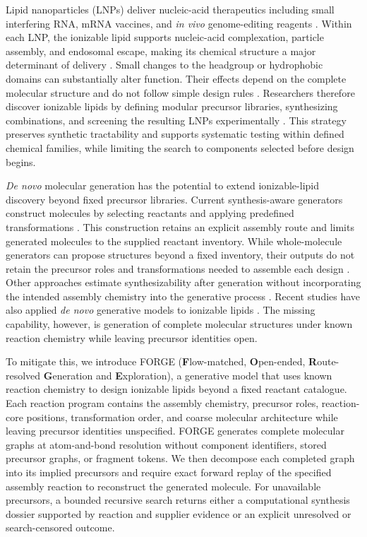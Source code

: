 \documentclass{article}
\begin{document}
Lipid nanoparticles (LNPs) deliver nucleic-acid therapeutics including small interfering RNA, mRNA vaccines, and \textit{in vivo} genome-editing reagents
\citep{adams2018patisiran,polack2020safety,baden2021efficacy,gillmore2021crispr}.
Within each LNP, the ionizable lipid supports nucleic-acid complexation, particle assembly, and endosomal escape, making its chemical structure a major determinant of delivery
\citep{cullis2017lipid,hou2021lipid}.
Small changes to the headgroup or hydrophobic domains can substantially alter function. Their effects depend on the complete molecular structure and do not follow simple design rules
\citep{cheng2020selective,han2021ionizable,hatit2023nanoparticle}.
Researchers therefore discover ionizable lipids by defining modular precursor libraries, synthesizing combinations, and screening the resulting LNPs experimentally
\citep{akinc2008combinatorial,love2010lipidlike,li2024accelerating,xu2024agile}.
This strategy preserves synthetic tractability and supports systematic testing within defined chemical families, while limiting the search to components selected before design begins.

\textit{De novo} molecular generation has the potential to extend ionizable-lipid discovery beyond fixed precursor libraries. Current synthesis-aware generators construct molecules by selecting reactants and applying predefined transformations
\citep{gao2022amortized,koziarski2024rgfn,cretu2025synflownet,rekesh2026syncogen}.
This construction retains an explicit assembly route and limits generated molecules to the supplied reactant inventory. While whole-molecule generators can propose structures beyond a fixed inventory, their outputs do not retain the precursor roles and transformations needed to assemble each design
\citep{qin2025defog,lee2025genmol}.
Other approaches estimate synthesizability after generation without incorporating the intended assembly chemistry into the generative process
\citep{gao2020synthesizability}.
Recent studies have also applied \textit{de novo} generative models to ionizable lipids
\citep{ou2024deep,maganti2026synthesis}.
The missing capability, however, is generation of complete molecular structures under known reaction chemistry while leaving precursor identities open.

To mitigate this, we introduce FORGE (\textbf{F}low-matched, \textbf{O}pen-ended, \textbf{R}oute-resolved \textbf{G}eneration and \textbf{E}xploration), a generative model that uses known reaction chemistry to design ionizable lipids beyond a fixed reactant catalogue. Each reaction program contains the assembly chemistry, precursor roles, reaction-core positions, transformation order, and coarse molecular architecture while leaving precursor identities unspecified. FORGE generates complete molecular graphs at atom-and-bond resolution without component identifiers, stored precursor graphs, or fragment tokens. We then decompose each completed graph into its implied precursors and require exact forward replay of the specified assembly reaction to reconstruct the generated molecule. For unavailable precursors, a bounded recursive search returns either a computational synthesis dossier supported by reaction and supplier evidence or an explicit unresolved or search-censored outcome.
\end{document}
